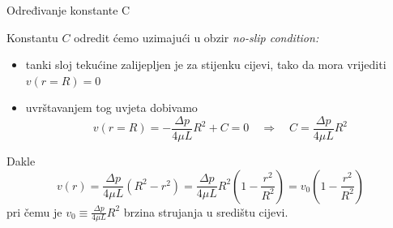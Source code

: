 \documentclass{beamer}
\begin{document}
\begin{frame}{Određivanje konstante C}

Konstantu $C$ odredit ćemo uzimajući u obzir \emph{no-slip condition:}
\begin{itemize}
\item tanki sloj tekućine zalijepljen je za stijenku cijevi, tako da mora
vrijediti $v(r=R)=0$
\item uvrštavanjem tog uvjeta dobivamo
\[
v(r=R)=-\frac{\Delta p}{4\mu L}R^{2}+C=0\quad\Rightarrow\quad C=\frac{\Delta p}{4\mu L}R^{2}
\]
\end{itemize}
Dakle
\[
v(r)=\frac{\Delta p}{4\mu L}(R^{2}-r^{2})=\frac{\Delta p}{4\mu L}R^{2}\left(1-\frac{r^{2}}{R^{2}}\right)=v_{0}\left(1-\frac{r^{2}}{R^{2}}\right)
\]
pri čemu je $v_{0}\equiv\frac{\Delta p}{4\mu L}R^{2}$ brzina strujanja
u središtu cijevi.
\end{frame}
\end{document}
